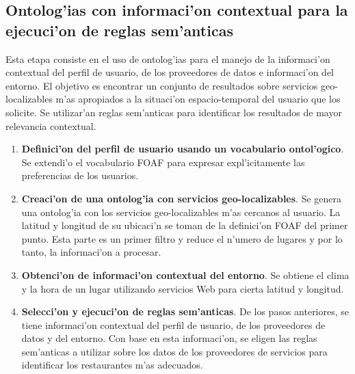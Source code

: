 \documentclass[11pt]{article}
\begin{document}
\subsection{Ontolog'ias con informaci'on contextual para la ejecuci'on de reglas sem'anticas}

Esta etapa consiste en el uso de ontolog'ias para el manejo de la informaci'on contextual del perfil de usuario, de los proveedores de datos e informaci'on del entorno. El objetivo es encontrar un conjunto de resultados sobre servicios geo-localizables m'as apropiados a la situaci'on espacio-temporal del usuario que los solicite. Se utilizar'an reglas sem'anticas para identificar los resultados de mayor relevancia contextual.

\begin{enumerate}
\item \textbf{Definici'on del perfil de usuario usando un vocabulario ontol'ogico}. Se extendi'o el vocabulario FOAF para expresar expl'icitamente las preferencias de los usuarios.
\item \textbf{Creaci'on de una ontolog'ia con servicios geo-localizables}. Se genera una ontolog'ia con los servicios geo-localizables m'as cercanos al usuario. La latitud y longitud de su ubicaci'n se toman de la definici'on FOAF del primer punto. Esta parte es un primer filtro y reduce el n'umero de lugares y por lo tanto, la informaci'on a procesar.
\item \textbf{Obtenci'on de informaci'on contextual del entorno}. Se obtiene el clima y la hora de un lugar utilizando servicios Web para cierta latitud y longitud.
\item \textbf{Selecci'on y ejecuci'on de reglas sem'anticas}. De los pasos anteriores, se tiene informaci'on contextual del perfil de usuario, de los proveedores de datos y del entorno. Con base en esta informaci'on, se eligen las reglas sem'anticas a utilizar sobre los datos de los proveedores de servicios para identificar los restaurantes m'as adecuados.
\end{enumerate}
\end{document}
